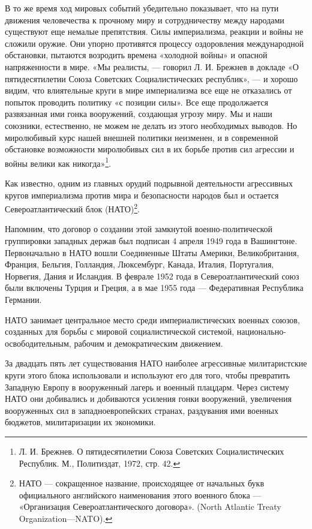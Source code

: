 \documentclass[12pt, a4paper, openany]{book}
\begin{document}
В то же время ход мировых событий убедительно показывает, что на пути движения человечества к прочному миру и сотрудничеству между народами существуют еще немалые препятствия. Силы империализма, реакции и войны не сложили оружие. Они упорно противятся процессу оздоровления международной обстановки, пытаются возродить времена «холодной войны» и опасной напряженности в мире. «Мы реалисты, — говорил Л. И. Брежнев в докладе «О пятидесятилетии Союза Советских Социалистических республик», — и хорошо видим, что влиятельные круги в мире империализма все еще не отказались от попыток проводить политику «с позиции силы». Все еще продолжается развязанная ими гонка вооружений, создающая угрозу миру. Мы и наши союзники, естественно, не можем не делать из этого необходимых выводов. Но миролюбивый курс нашей внешней политики неизменен, и в современной обстановке возможности миролюбивых сил в их борьбе против сил агрессии и войны велики как никогда»{\footnote{Л. И. Брежнев. О пятидесятилетии Союза Советских Социалистических Республик. М., Политиздат, 1972, стр. 42.}}.

Как известно, одним из главных орудий подрывной деятельности агрессивных кругов империализма против мира и безопасности народов был и остается Североатлантический блок (НАТО){\footnote{НАТО — сокращенное название, происходящее от начальных букв официального английского наименования этого военного блока — «Организация Североатлантического договора». (North Atlantic Treaty Organization—NATO).}}.

Напомним, что договор о создании этой замкнутой военно-политической группировки западных держав был подписан 4 апреля 1949 года в Вашингтоне. Первоначально в НАТО вошли Соединенные Штаты Америки, Великобритания, Франция, Бельгия, Голландия, Люксембург, Канада, Италия, Португалия, Норвегия, Дания и Исландия. В феврале 1952 года в Североатлантический союз были включены Турция и Греция, а в мае 1955 года — Федеративная Республика Германии.

НАТО занимает центральное место среди империалистических военных союзов, созданных для борьбы с мировой социалистической системой, национально-освободительным, рабочим и демократическим движением.

За двадцать пять лет существования НАТО наиболее агрессивные милитаристские круги этого блока использовали и используют его для того, чтобы превратить Западную Европу в вооруженный лагерь и военный плацдарм. Через систему НАТО они добивались и добиваются усиления гонки вооружений, увеличения вооруженных сил в западноевропейских странах, раздувания ими военных бюджетов, милитаризации их экономики.
\end{document}
